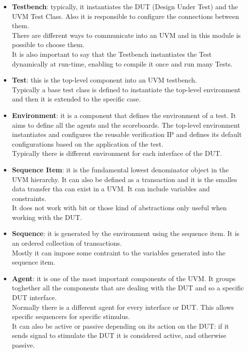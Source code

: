 \begin{itemize}
    \item \textbf{Testbench}: typically, it instantiates the DUT (Design Under Test) and the UVM Test Class. Also it is responsible to configure the connections between them.\\
    There are different ways to communicate into an UVM and in this module is possible to choose them.\\
    It is also important to say that the Testbench instantiates the Test dynamically at run-time, enabling to compile it once and run many Tests.
    
    \item \textbf{Test}: this is the top-level component into an UVM testbench.\\
    Typically a base test class is defined to instantiate the top-level environment and then it is extended to the specific case.
    
    \item \textbf{Environment}: it is a component that defines the environment of a test. It aims to define all the agents and the scoreboards. 
    The top-level environment instantiates and configures the reusable verification IP and defines its default configurations based on the application of the test.\\
    
    Typically there is different environment for each interface of the DUT.
    
    \item \textbf{Sequence Item}: it is the fundamental lowest denominator object in the UVM hierarchy. It can also be defined as a transaction and it is the smalles data transfer tha can exist in a UVM. It can include variables and constraints.\\
    
    It does not work with bit or those kind of abstractions only useful when working with the DUT.
    
    \item \textbf{Sequence}: it is generated by the environment using the sequence item. It is an ordered collection of transactions.\\
    Mostly it can impose some contraint to the variables generated into the sequence item.
    
    \item \textbf{Agent}: it is one of the most important components of the UVM. It groups toghether all the components that are dealing with the DUT and so a specific DUT interface.\\
    Normally there is a different agent for every interface or DUT. This allows specific sequencers for specific stimulus.\\
    It can also be active or passive depending on its action on the DUT: if it sends signal to stimulate the DUT it is considered active, and otherwise passive.
    

\end{itemize}
